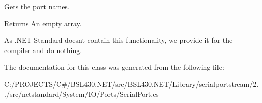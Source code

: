 Gets the port names. 

\begin{DoxyReturn}{Returns}
An empty array.
\end{DoxyReturn}


As .N\+ET Standard doesn\textquotesingle{}t contain this functionality, we provide it for the compiler and do nothing. 

The documentation for this class was generated from the following file\+:\begin{DoxyCompactItemize}
\item 
C\+:/\+P\+R\+O\+J\+E\+C\+T\+S/\+C\#/\+B\+S\+L430.\+N\+E\+T/src/\+B\+S\+L430.\+N\+E\+T/\+Library/serialportstream/2../src/netstandard/\+System/\+I\+O/\+Ports/Serial\+Port.\+cs\end{DoxyCompactItemize}
